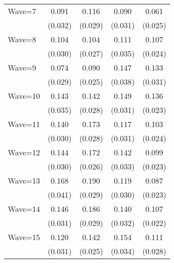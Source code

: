 {\begin{tabular}{l*{4}{c}}
Wave=7              &       0.091\sym{***}&       0.116\sym{***}&       0.090\sym{***}&       0.061\sym{**} \\
                    &     (0.032)         &     (0.029)         &     (0.031)         &     (0.025)         \\
Wave=8              &       0.104\sym{***}&       0.104\sym{***}&       0.111\sym{***}&       0.107\sym{***}\\
                    &     (0.030)         &     (0.027)         &     (0.035)         &     (0.024)         \\
Wave=9              &       0.074\sym{**} &       0.090\sym{***}&       0.147\sym{***}&       0.133\sym{***}\\
                    &     (0.029)         &     (0.025)         &     (0.038)         &     (0.031)         \\
Wave=10             &       0.143\sym{***}&       0.142\sym{***}&       0.149\sym{***}&       0.136\sym{***}\\
                    &     (0.035)         &     (0.028)         &     (0.031)         &     (0.023)         \\
Wave=11             &       0.140\sym{***}&       0.173\sym{***}&       0.117\sym{***}&       0.103\sym{***}\\
                    &     (0.030)         &     (0.028)         &     (0.031)         &     (0.024)         \\
Wave=12             &       0.144\sym{***}&       0.172\sym{***}&       0.142\sym{***}&       0.099\sym{***}\\
                    &     (0.030)         &     (0.026)         &     (0.033)         &     (0.023)         \\
Wave=13             &       0.168\sym{***}&       0.190\sym{***}&       0.119\sym{***}&       0.087\sym{***}\\
                    &     (0.041)         &     (0.029)         &     (0.030)         &     (0.023)         \\
Wave=14             &       0.146\sym{***}&       0.186\sym{***}&       0.140\sym{***}&       0.107\sym{***}\\
                    &     (0.031)         &     (0.029)         &     (0.032)         &     (0.022)         \\
Wave=15             &       0.120\sym{***}&       0.142\sym{***}&       0.154\sym{***}&       0.111\sym{***}\\
                    &     (0.031)         &     (0.025)         &     (0.034)         &     (0.028)         \\

\end{tabular}}
